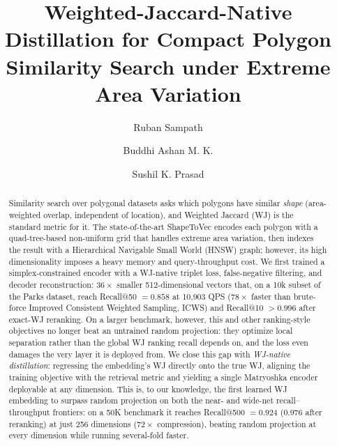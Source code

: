 \documentclass[sigconf]{acmart}
\begin{document}
\title{Weighted-Jaccard-Native Distillation for Compact Polygon
Similarity Search under Extreme Area Variation}

\author{Ruban Sampath}
\author{Buddhi Ashan M. K.}
\author{Sushil K. Prasad}
\renewcommand{\shortauthors}{Sampath et al.}

\begin{abstract}
Similarity search over polygonal datasets asks which polygons have similar \emph{shape}
(area-weighted overlap, independent of location), and Weighted Jaccard (WJ) is the
standard metric for it. The state-of-the-art ShapeToVec encodes each polygon with a
quad-tree-based non-uniform grid that handles extreme area variation, then indexes the
result with a Hierarchical Navigable Small World (HNSW) graph; however, its high
dimensionality imposes a heavy memory and query-throughput cost. We first trained a
simplex-constrained encoder with a WJ-native triplet loss, false-negative filtering, and
decoder reconstruction: $36\times$ smaller 512-dimensional vectors that, on a 10k subset
of the Parks dataset, reach Recall@50 $=0.858$ at 10{,}903 QPS ($78\times$ faster than
brute-force Improved Consistent Weighted Sampling, ICWS) and Recall@10 $>0.996$ after
exact-WJ reranking. On a larger benchmark, however, this and other ranking-style
objectives no longer beat an untrained random projection: they optimize local separation
rather than the global WJ ranking recall depends on, and the loss even damages the very
layer it is deployed from. We close this gap with \emph{WJ-native distillation}:
regressing the embedding's WJ directly onto the true WJ, aligning the training
objective with the retrieval metric and yielding a single Matryoshka encoder deployable
at any dimension. This is, to our knowledge, the first learned WJ embedding to surpass
random projection on both the near- and wide-net recall--throughput frontiers: on a 50K
benchmark it reaches Recall@500 $=0.924$ ($0.976$ after reranking) at just 256
dimensions ($72\times$ compression), beating random projection at every dimension while
running several-fold faster.
\end{abstract}
\end{document}
